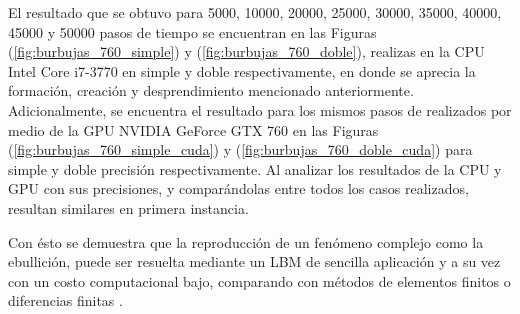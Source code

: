 El resultado que se obtuvo para 5000, 10000, 20000, 25000, 30000, 35000, 40000, 45000 y 50000 pasos de tiempo se encuentran en las Figuras (\ref{fig:burbujas_760_simple}) y (\ref{fig:burbujas_760_doble}), realizas en la CPU Intel Core i7-3770 en simple y doble  respectivamente, en donde se aprecia la formación, creación y desprendimiento mencionado anteriormente. Adicionalmente, se encuentra el resultado para los mismos pasos de realizados por medio de la GPU NVIDIA GeForce GTX 760 en las Figuras (\ref{fig:burbujas_760_simple_cuda}) y (\ref{fig:burbujas_760_doble_cuda}) para simple y doble precisión respectivamente. Al analizar los resultados de la CPU y GPU con sus precisiones, y comparándolas entre todos los casos realizados, resultan similares en primera instancia.

Con ésto se demuestra que la reproducción de un fenómeno complejo como la ebullición, puede ser resuelta mediante un LBM de sencilla aplicación y a su vez con un costo computacional bajo, comparando con métodos de elementos finitos o diferencias finitas \cite{guo2013lattice}.








